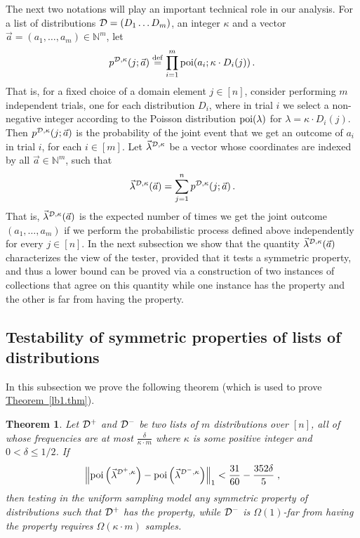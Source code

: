 \documentclass[10pt]{article}
\newtheorem{theorem}{Theorem}[section]
\theoremstyle{definition}
\numberwithin{equation}{section}
\newcommand{\expref}[2]{\texorpdfstring{\hyperref[#2]{#1~\ref{#2}}}{#1~\ref{#2}}}
\newcommand{\poi}{{\rm poi}}
\newcommand{\calD}{{\cal D}}
\newcommand{\eqdef}{\stackrel{\rm def}{=}}
\newcommand{\BEQ}{\begin{equation}} \newcommand{\EEQ}{\end{equation}}
\newcommand{\w}{\kappa}
\begin{document}
%

\PoiExpLem

%

The next two notations will play an important technical role in our analysis.
For a list of distributions $\calD = (D_1 \ldots D_m)$, an integer $\w$ and
a vector $\vec{a} = (a_1,\ldots,a_m) \in \mathbb{N}^m$, let
\BEQ
p^{\calD,\w}(j;\vec{a}) \eqdef \prod_{i=1}^m \poi(a_i;\w\cdot D_i(j))\,.
\label{calDi-def.eq}
\EEQ
That is, for a fixed choice of a domain element $j\in[n]$,
consider performing $m$ independent trials, one for each distribution $D_i$, where in trial $i$
we select a non-negative integer according to the Poisson distribution
$\poi(\lambda)$ for $\lambda = \w\cdot D_i(j)$.
Then $p^{\calD,\w}(j;\vec{a})$ is the probability of the joint event
that we get an outcome of $a_i$ in trial $i$, for each $i \in [m]$.
Let $\vec{\lambda}^{\calD,\w}$ be a vector whose coordinates are indexed by
all $\vec{a} \in \mathbb{N}^m$, such that
\BEQ
\vec{\lambda}^{\calD,\w}(\vec{a})=\sum_{j=1}^n p^{\calD,\w}(j;\vec{a})\,.
\label{vecl-calD-def.eq}
\EEQ
That is, $\vec{\lambda}^{\calD,\w}(\vec{a})$ is the expected number of
times we get the joint outcome $(a_1,\ldots,a_m)$ if we perform the
probabilistic process defined above independently for every
$j\in[n]$. In the next subsection we show that the quantity $\vec{\lambda}^{\calD,\w}(\vec{a})$ characterizes the view of the tester,
provided that it tests a symmetric property, and thus a lower bound
can be proved via a construction of two instances of collections that
agree on this quantity while one instance has the property and
the other is far from having the property.

\subsection{Testability of symmetric properties of lists of distributions}
\label{wish.subsec}

%

In this subsection we prove the following theorem (which is used to prove
\expref{Theorem}{lb1.thm}).




%

\begin{theorem} \label{wish.thm}
%
%
Let $\calD^+$ and $\calD^-$
be two lists of $m$ distributions over $[n]$, all of whose frequencies
are at most $\frac{\delta}{\w\cdot m}$ where $\w$ is some positive integer and
%
%
%
%
$0< \delta \leq 1/2$.  If %
\BEQ
\left\|\poi\left(\vec{\lambda}^{\calD^+,\w}\right) -
    \poi\left(\vec{\lambda}^{\calD^-,\w}\right) \right\|_1
   < \frac{31}{60} - \frac{352\delta}{5}\;,
\label{poi-poi.eq}
\EEQ
 then testing in the uniform sampling model
 any symmetric property of distributions  such that
 $\calD^+$ has the property, while
$\calD^-$ is $\Omega(1)$-far  from having the property
requires $\Omega(\w\cdot m)$ samples.
%
\end{theorem}
%
%
\end{document}
